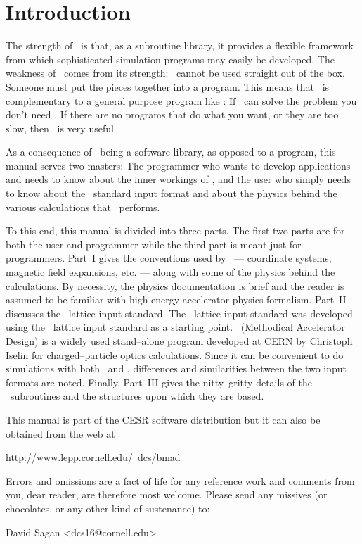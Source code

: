 \section*{Introduction}

The strength of \bmad\ is that, as a subroutine library, it provides a
flexible framework from which sophisticated simulation programs may
easily be developed.  The weakness of \bmad\ comes from its strength:
\bmad\ cannot be used straight out of the box. Someone must put the
pieces together into a program. This means that \bmad\ is complementary
to a general purpose program like \mad\cite{maduser,madphysics}: 
If \mad\ can solve the problem
you don't need \bmad. If there are no programs that do what you want,
or they are too slow, then \bmad\ is very useful.

As a consequence of \bmad\ being a software library, as opposed to a
program, this manual serves two masters: The programmer who wants to
develop applications and needs to know about the inner workings of \bmad,
and the user who simply needs to know about the \bmad\ standard input
format and about the physics behind the various calculations that \bmad\
performs.

To this end, this manual is divided into three parts. The first two
parts are for both the user and programmer while the third part is
meant just for programmers. Part~I gives the conventions used by
\bmad\ --- coordinate systems, magnetic field expansions, etc. ---
along with some of the physics behind the calculations. By necessity,
the physics documentation is brief and the reader is assumed to be familiar
with high energy accelerator physics formalism. Part~II discusses the
\bmad\ lattice input standard.  The \bmad\ lattice input standard was
developed using the \mad\ lattice input standard as a starting
point. \mad\ (Methodical Accelerator Design) is a widely used
stand--alone program developed at CERN by Christoph Iselin for
charged--particle optics calculations. Since it can be convenient
to do simulations with both \mad\ and \bmad, differences and
similarities between the two input formats are noted. 
Finally, Part~III gives the nitty--gritty details of the \bmad\
subroutines and the structures upon which they are based.

This manual is part of the 
CESR software distribution but it can also be obtained from the web at
\begin{example}
  http://www.lepp.cornell.edu/~dcs/bmad
\end{example}

Errors and omissions are a fact of life for any reference work and
comments from you, dear reader, are therefore most welcome. Please
send any missives (or chocolates, or any other kind of sustenance) to:
\begin{example}
  David Sagan <dcs16@cornell.edu>
\end{example}
